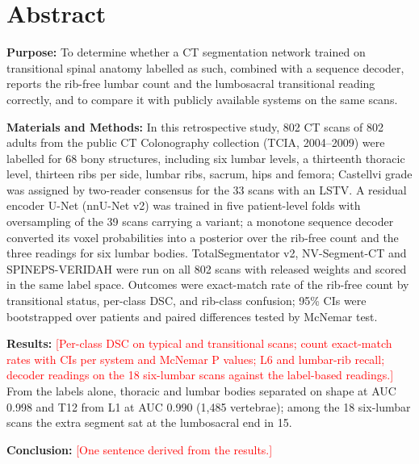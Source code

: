 \documentclass[12pt]{article}
\newcommand{\todo}[1]{\textcolor{red}{[#1]}}
\begin{document}
\section*{Abstract}
\textbf{Purpose:} To determine whether a CT segmentation network trained on transitional spinal anatomy labelled as such, combined with a sequence decoder, reports the rib-free lumbar count and the lumbosacral transitional reading correctly, and to compare it with publicly available systems on the same scans.

\textbf{Materials and Methods:} In this retrospective study, 802 CT scans of 802 adults from the public CT Colonography collection (TCIA, 2004--2009) were labelled for 68 bony structures, including six lumbar levels, a thirteenth thoracic level, thirteen ribs per side, lumbar ribs, sacrum, hips and femora; Castellvi grade was assigned by two-reader consensus for the 33 scans with an LSTV. A residual encoder U-Net (nnU-Net v2) was trained in five patient-level folds with oversampling of the 39 scans carrying a variant; a monotone sequence decoder converted its voxel probabilities into a posterior over the rib-free count and the three readings for six lumbar bodies. TotalSegmentator v2, NV-Segment-CT and SPINEPS-VERIDAH were run on all 802 scans with released weights and scored in the same label space. Outcomes were exact-match rate of the rib-free count by transitional status, per-class DSC, and rib-class confusion; 95\% CIs were bootstrapped over patients and paired differences tested by McNemar test.

\textbf{Results:} \todo{Per-class DSC on typical and transitional scans; count exact-match rates with CIs per system and McNemar P values; L6 and lumbar-rib recall; decoder readings on the 18 six-lumbar scans against the label-based readings.} From the labels alone, thoracic and lumbar bodies separated on shape at AUC 0.998 and T12 from L1 at AUC 0.990 (1,485 vertebrae); among the 18 six-lumbar scans the extra segment sat at the lumbosacral end in 15.

\textbf{Conclusion:} \todo{One sentence derived from the results.}

\end{document}
